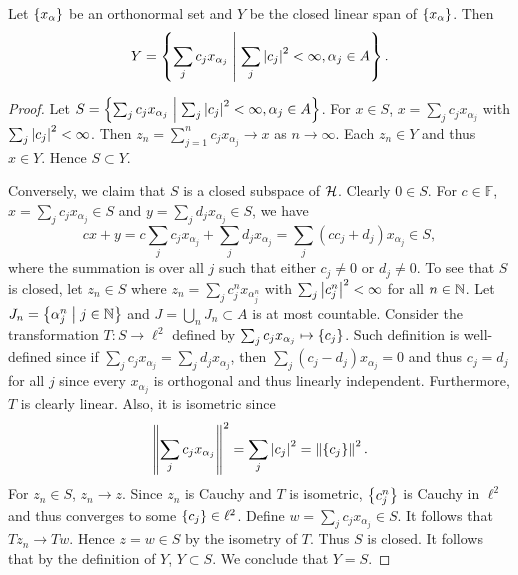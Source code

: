 \begin{proposition}
    Let $\left\{ {x_\alpha} \right\}$ be an orthonormal set and $Y$ be the closed linear span of 
    $\left\{ {x_\alpha} \right\}$. Then 
    \begin{equation*}
        Y = \left\{ \sum_j c_jx_{\alpha_j} \;\middle\vert\; \sum_j \left\lvert {c_j} \right\rvert^2 < \infty, \alpha_j\in A \right\}.
    \end{equation*}
\end{proposition}
\begin{proof}
    Let $S = \left\{ \sum_j c_jx_{\alpha_j} \;\middle\vert\; \sum_j \left\lvert {c_j} \right\rvert^2 < \infty, \alpha_j\in A \right\}$. 
    For $x\in S$, $x = \sum_j c_jx_{\alpha_j}$ with $\sum_j \left\lvert {c_j} \right\rvert^2 < \infty$. 
    Then $z_n = \sum_{j=1}^{n} c_jx_{\alpha_j}\to x$ as $n\to\infty$. 
    Each $z_n\in Y$ and thus $x\in Y$. Hence $S\subset Y$. 

    Conversely, we claim that $S$ is a closed subspace of $\mathcal{H}$. 
    Clearly $0\in S$. For $c\in\mathbb{F}$, $x = \sum_j c_jx_{\alpha_j}\in S$ 
    and $y = \sum_j d_jx_{\alpha_j}\in S$, we have 
    \begin{equation*}
        cx + y = c\sum_j c_jx_{\alpha_j} + \sum_j d_jx_{\alpha_j} = \sum_j (cc_j + d_j)x_{\alpha_j}\in S,
    \end{equation*}
    where the summation is over all $j$ such that either $c_j\neq 0$ or $d_j\neq 0$.
    To see that $S$ is closed, let $z_n\in S$ where $z_n = \sum_j c_j^nx_{\alpha_j^n}$ 
    with $\sum_j \left\lvert {c_j^n} \right\rvert^2 < \infty$ for all $n\in\mathbb{N}$. Let 
    $J_n = \left\{ \alpha_j^n \;\middle\vert\; j\in\mathbb{N} \right\}$ and $J = \bigcup_n J_n\subset A$ 
    is at most countable. Consider the transformation $T:S\to\ell^2$ 
    defined by $\sum_j c_jx_{\alpha_j}\mapsto \left\{ {c_j} \right\}$. Such 
    definition is well-defined since if $\sum_j c_jx_{\alpha_j} = \sum_j d_jx_{\alpha_j}$, 
    then $\sum_j (c_j - d_j)x_{\alpha_j} = 0$ and thus $c_j = d_j$ for all $j$ since 
    every $x_{\alpha_j}$ is orthogonal and thus linearly independent. 
    Furthermore, $T$ is clearly linear. Also, it is isometric 
    since 
    \begin{equation*}
        \left\lVert {\sum_j c_jx_{\alpha_j}} \right\rVert^2 = \sum_j \left\lvert {c_j} \right\rvert^2 = \left\lVert {\left\{ {c_j} \right\}} \right\rVert^2.
    \end{equation*}
    For $z_n\in S$, $z_n\to z$. Since $z_n$ is Cauchy and $T$ is 
    isometric, $\left\{ {c_j^n} \right\}$ is Cauchy in $\ell^2$ and thus converges 
    to some $\left\{ {c_j} \right\}\in\ell^2$. Define $w = \sum_j c_jx_{\alpha_j}\in S$. 
    It follows that $Tz_n\to Tw$. Hence $z = w\in S$ by the isometry 
    of $T$. Thus $S$ is closed. It follows that by the definition 
    of $Y$, $Y\subset S$. We conclude that $Y = S$.
\end{proof}

